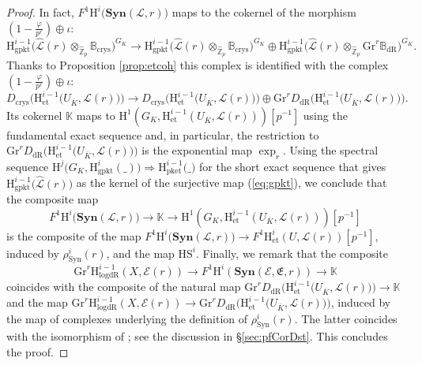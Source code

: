 \documentclass[asterisque,english]{smfart}
\begin{document}
\begin{proof}
In fact,  $F^1 \mathrm{H}^i\bigl(\mathbf{Syn}(\mathcal{L},r)\bigr)$ maps to the cokernel of  the morphism $(1-\frac{\varphi}{p^r}) \oplus   \iota$:
 $$\mathrm{H}^{i-1}_{\mathrm{gpkt}}\bigl( \widehat{\mathcal{L}}(r)\otimes_{\widehat{\mathbb{Z}}_p} \mathbb{B}_{\mathrm{crys}}  \bigr)^{G_K} \to \mathrm{H}^{i-1}_{\mathrm{gpkt}}\bigl(\widehat{\mathcal{L}}(r)\otimes_{\widehat{\mathbb{Z}}_p} \mathbb{B}_{\mathrm{crys}} \bigr)^{G_K} \oplus \mathrm{H}^{i-1}_{\mathrm{gpkt}}\bigl( \widehat{\mathcal{L}}(r)\otimes_{\widehat{\mathbb{Z}}_p}\mathrm{Gr}^r \mathbb{B}_{\mathrm{dR}} \bigr)^{G_K}.$$Thanks to Proposition \ref{prop:etcoh} this complex is identified with the complex
$(1-\frac{\varphi}{p^r}) \oplus   \iota$: $$D_{\mathrm{crys}}\bigl(\mathrm{H}^{i-1}_{\mathrm{et}}\bigl(U_{\overline{K}},  \mathcal{L}(r)\bigr)\bigr)  \longrightarrow D_{\mathrm{crys}}\bigl(\mathrm{H}^{i-1}_{\mathrm{et}}\bigl(U_{\overline{K}}, \mathcal{L}(r)\bigr)\bigr)\oplus \mathrm{Gr}^r D_{\mathrm{dR}}\bigl(\mathrm{H}^{i-1}_{\mathrm{et}}\bigl(U_{\overline{K}}, \mathcal{L}(r)\bigr)\bigr).$$Its cokernel $\mathbb{K}$ maps to $\mathrm{H}^{1}\left( G_{K},\mathrm{H}_{\mathrm{et
}}^{i-1}\left( U_{\overline{K}},\mathcal{L}(r)\right) \right) \left[ p^{-1}
\right]$ using the fundamental exact sequence and, in particular,  the restriction to $\mathrm{Gr}^r D_{\mathrm{dR}}\bigl(\mathrm{H}^{i-1}_{\mathrm{et}}\bigl(U_{\overline{K}}, \mathcal{L}(r)\bigr)\bigr)$ is the exponential map $\exp_r$. Using the spectral sequence $\mathrm{H}^j\bigl(G_K, \mathrm{H}^i_{\mathrm{gpkt}}(\_)\bigr) \Longrightarrow \mathrm{H}^{i-1}_{\mathrm{pket}}\bigl(\_\bigr)$ for the short exact sequence that gives $ \mathrm{H}^{i-1}_{\mathrm{gpkt}}\bigl( \widehat{\mathcal{L}}(r)\bigr)$ as the kernel of the surjective map (\ref{eq:gpkt}), we conclude that the composite map $$F^1 \mathrm{H}^i\bigl(\mathbf{Syn}(\mathcal{L},r)\bigr)\longrightarrow \mathbb{K} \longrightarrow   \mathrm{H}^{1}\left( G_{K},\mathrm{H}_{\mathrm{et
}}^{i-1}\left( U_{\overline{K}},\mathcal{L}(r)\right) \right) \left[ p^{-1}
\right]$$is the composite of  the map $F^1 \mathrm{H}^i\bigl(\mathbf{Syn}(\mathcal{L},r)\bigr)\to F^1 \mathrm{H}_{\mathrm{et}}^{i}\left( U,\mathcal{L}\left(
r\right) \right)[p^{-1}] $, induced by $\rho_{\mathrm{Syn}}^i(r) $,  and the map $\mathrm{HS}^{i}$. 
Finally, we remark that the composite $$\mathrm{Gr}^r \mathrm{H}_{\mathrm{logdR}}^{i-1}\left( X,\mathcal{E}\left( r\right)
\right) \longrightarrow F^{1}\mathrm{H}
^{i}\left( \mathbf{Syn}\left( \mathcal{E},\mathfrak{E},r\right)
\right)\longrightarrow \mathbb{K}$$coincides with the composite of the natural map $\mathrm{Gr}^r D_{\mathrm{dR}}\bigl(\mathrm{H}^{i-1}_{\mathrm{et}}\bigl(U_{\overline{K}}, \mathcal{L}(r)\bigr)\bigr)\to \mathbb{K}$ and the map  $\mathrm{Gr}^r \mathrm{H}_{\mathrm{logdR}}^{i-1}\left( X,\mathcal{E}\left( r\right)
\right) \to  \mathrm{Gr}^r D_{\mathrm{dR}}\bigl(\mathrm{H}^{i-1}_{\mathrm{et}}\bigl(U_{\overline{K}}, \mathcal{L}(r)\bigr)\bigr)$, induced by the map of complexes underlying the definition of $\rho_{\mathrm{Syn}}^i(r) $. The latter coincides with the isomorphism of \cite[Thm. 3.2.7(3)]{DLLZb}; see the discussion in \S \ref{sec:pfCorDst}. This concludes the proof.


\end{proof}
\end{document}

